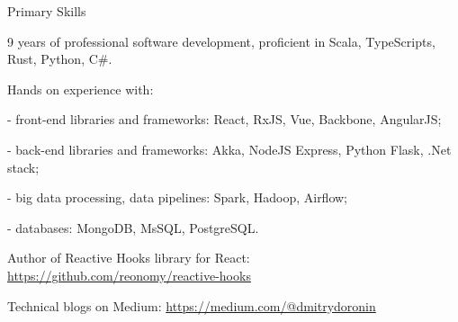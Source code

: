 \documentclass{resume}
\begin{document}

\begin{rSection}{Primary Skills}

9 years of professional software development, proficient in Scala, TypeScripts, Rust, Python, C\#.

\item Hands on experience with:
\item - front-end libraries and frameworks: 
React, RxJS, Vue, Backbone, AngularJS;
\item - back-end libraries and frameworks: 
Akka, NodeJS Express, Python Flask, .Net stack;
\item - big data processing, data pipelines:
Spark, Hadoop, Airflow;
\item - databases:
MongoDB, MsSQL, PostgreSQL.

\item Author of Reactive Hooks library for React:
\url{https://github.com/reonomy/reactive-hooks}
\item Technical blogs on Medium: \url{https://medium.com/@dmitrydoronin}

\end{rSection}

\end{document}
